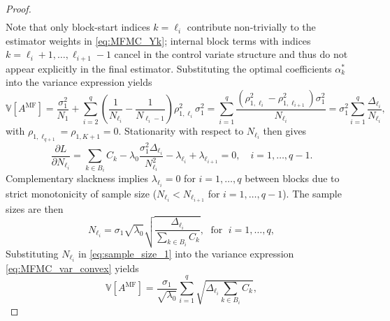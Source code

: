 \begin{proof}
\begin{align}
\end{align}
%
Note that only block-start indices $k=\ell_i$ contribute non-trivially to the estimator weights in \eqref{eq:MFMC_Yk}; internal block terms with indices $k = \ell_i+1,\ldots, \ell_{i+1}-1$  cancel in the control variate structure and thus do not appear explicitly in the final estimator. Substituting the optimal coefficients $\alpha_k^*$ into the variance expression yields
%
\begin{equation}\label{eq:MFMC_var_convex}
    \mathbb{V}\left[A^{\text{MF}}\right] = \frac{\sigma_1^2}{N_1}+\sum_{i=2}^q
\left(\frac{1}{N_{\ell_{i}}}-\frac{1}{N_{\ell_{i}-1}}\right)\rho_{1,\ell_i}^2\sigma_1^2=\sum_{i=1}^{q} \frac{ \left(\rho_{1,\ell_i}^2-\rho_{1,\ell_{i+1}}^2\right)\sigma_1^2}{N_{\ell_i}}=\sigma_1^2\sum_{i=1}^{q} \frac{\Delta_{\ell_i}}{N_{\ell_i}},
\end{equation}
%
with $\rho_{1,\ell_{q+1}} = \rho_{1,K+1} = 0$. Stationarity with respect to \(N_{\ell_i}\) then gives
%
\[
\frac{\partial L}{\partial N_{\ell_i}} =\sum_{k\in B_i}C_{k} -  \lambda_0\frac{\sigma_1^2\Delta_{\ell_i}}{N_{\ell_i}^2}-\lambda_{\ell_{i}}+\lambda_{\ell_{i+1}}=0,\quad i = 1, \ldots,q-1.
\]
%
Complementary slackness implies $\lambda_{\ell_i} = 0$ for $i=1,\ldots, q$ between blocks due to strict monotonicity of sample size ($N_{\ell_{i}} < N_{\ell_{i+1}}$ for $i = 1, \ldots, q-1$). The sample sizes are then
%
\begin{equation}\label{eq:sample_size_1}
    N_{\ell_i} = \sigma_1\sqrt{\lambda_0} \sqrt{\frac{\Delta_{\ell_i}}{\sum_{k\in B_i} C_{k}}}, \;\text{ for }\; i=1,\ldots,q,
\end{equation}
%
Substituting $N_{\ell_i}$ in \eqref{eq:sample_size_1} into the variance expression \eqref{eq:MFMC_var_convex} yields
%
\begin{equation*} \label{eq:MFMC_variance2}
    \mathbb{V}\left[A^{\text{MF}}\right] = \frac{\sigma_1}{\sqrt{\lambda_0}}\sum_{i=1}^q\sqrt{\Delta_{\ell_i}\sum_{k\in B_i} C_k},
\end{equation*}

\end{proof}
